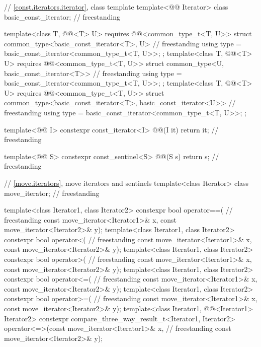 \begin{codeblock}
{  // \ref{const.iterators.iterator}, class template 
  template<@@ Iterator>
    class basic_const_iterator;                                                     // freestanding

  template<class T, @@<T> U>
    requires @@<common_type_t<T, U>>
  struct common_type<basic_const_iterator<T>, U> {                                  // freestanding
    using type = basic_const_iterator<common_type_t<T, U>>;
  };
  template<class T, @@<T> U>
    requires @@<common_type_t<T, U>>
  struct common_type<U, basic_const_iterator<T>> {                                  // freestanding
    using type = basic_const_iterator<common_type_t<T, U>>;
  };
  template<class T, @@<T> U>
    requires @@<common_type_t<T, U>>
  struct common_type<basic_const_iterator<T>, basic_const_iterator<U>> {            // freestanding
    using type = basic_const_iterator<common_type_t<T, U>>;
  };

  template<@@ I>
    constexpr const_iterator<I> @@(I it) { return it; }            // freestanding

  template<@@ S>
    constexpr const_sentinel<S> @@(S s) { return s; }              // freestanding

  // \ref{move.iterators}, move iterators and sentinels
  template<class Iterator> class move_iterator;                                     // freestanding

  template<class Iterator1, class Iterator2>
    constexpr bool operator==(                                                      // freestanding
      const move_iterator<Iterator1>& x, const move_iterator<Iterator2>& y);
  template<class Iterator1, class Iterator2>
    constexpr bool operator<(                                                       // freestanding
      const move_iterator<Iterator1>& x, const move_iterator<Iterator2>& y);
  template<class Iterator1, class Iterator2>
    constexpr bool operator>(                                                       // freestanding
      const move_iterator<Iterator1>& x, const move_iterator<Iterator2>& y);
  template<class Iterator1, class Iterator2>
    constexpr bool operator<=(                                                      // freestanding
      const move_iterator<Iterator1>& x, const move_iterator<Iterator2>& y);
  template<class Iterator1, class Iterator2>
    constexpr bool operator>=(                                                      // freestanding
      const move_iterator<Iterator1>& x, const move_iterator<Iterator2>& y);
  template<class Iterator1, @@<Iterator1> Iterator2>
    constexpr compare_three_way_result_t<Iterator1, Iterator2>
      operator<=>(const move_iterator<Iterator1>& x,                                // freestanding
                  const move_iterator<Iterator2>& y);

}
\end{codeblock}

